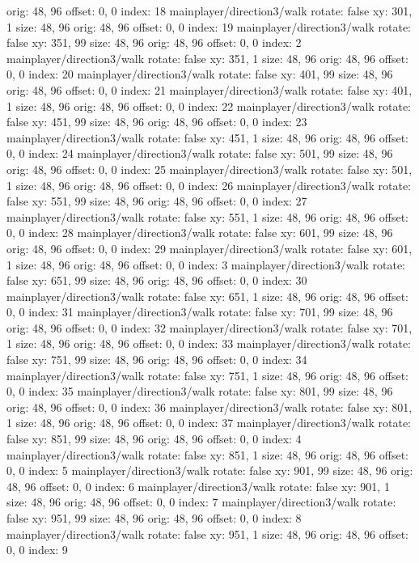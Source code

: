   orig: 48, 96
  offset: 0, 0
  index: 18
mainplayer/direction3/walk
  rotate: false
  xy: 301, 1
  size: 48, 96
  orig: 48, 96
  offset: 0, 0
  index: 19
mainplayer/direction3/walk
  rotate: false
  xy: 351, 99
  size: 48, 96
  orig: 48, 96
  offset: 0, 0
  index: 2
mainplayer/direction3/walk
  rotate: false
  xy: 351, 1
  size: 48, 96
  orig: 48, 96
  offset: 0, 0
  index: 20
mainplayer/direction3/walk
  rotate: false
  xy: 401, 99
  size: 48, 96
  orig: 48, 96
  offset: 0, 0
  index: 21
mainplayer/direction3/walk
  rotate: false
  xy: 401, 1
  size: 48, 96
  orig: 48, 96
  offset: 0, 0
  index: 22
mainplayer/direction3/walk
  rotate: false
  xy: 451, 99
  size: 48, 96
  orig: 48, 96
  offset: 0, 0
  index: 23
mainplayer/direction3/walk
  rotate: false
  xy: 451, 1
  size: 48, 96
  orig: 48, 96
  offset: 0, 0
  index: 24
mainplayer/direction3/walk
  rotate: false
  xy: 501, 99
  size: 48, 96
  orig: 48, 96
  offset: 0, 0
  index: 25
mainplayer/direction3/walk
  rotate: false
  xy: 501, 1
  size: 48, 96
  orig: 48, 96
  offset: 0, 0
  index: 26
mainplayer/direction3/walk
  rotate: false
  xy: 551, 99
  size: 48, 96
  orig: 48, 96
  offset: 0, 0
  index: 27
mainplayer/direction3/walk
  rotate: false
  xy: 551, 1
  size: 48, 96
  orig: 48, 96
  offset: 0, 0
  index: 28
mainplayer/direction3/walk
  rotate: false
  xy: 601, 99
  size: 48, 96
  orig: 48, 96
  offset: 0, 0
  index: 29
mainplayer/direction3/walk
  rotate: false
  xy: 601, 1
  size: 48, 96
  orig: 48, 96
  offset: 0, 0
  index: 3
mainplayer/direction3/walk
  rotate: false
  xy: 651, 99
  size: 48, 96
  orig: 48, 96
  offset: 0, 0
  index: 30
mainplayer/direction3/walk
  rotate: false
  xy: 651, 1
  size: 48, 96
  orig: 48, 96
  offset: 0, 0
  index: 31
mainplayer/direction3/walk
  rotate: false
  xy: 701, 99
  size: 48, 96
  orig: 48, 96
  offset: 0, 0
  index: 32
mainplayer/direction3/walk
  rotate: false
  xy: 701, 1
  size: 48, 96
  orig: 48, 96
  offset: 0, 0
  index: 33
mainplayer/direction3/walk
  rotate: false
  xy: 751, 99
  size: 48, 96
  orig: 48, 96
  offset: 0, 0
  index: 34
mainplayer/direction3/walk
  rotate: false
  xy: 751, 1
  size: 48, 96
  orig: 48, 96
  offset: 0, 0
  index: 35
mainplayer/direction3/walk
  rotate: false
  xy: 801, 99
  size: 48, 96
  orig: 48, 96
  offset: 0, 0
  index: 36
mainplayer/direction3/walk
  rotate: false
  xy: 801, 1
  size: 48, 96
  orig: 48, 96
  offset: 0, 0
  index: 37
mainplayer/direction3/walk
  rotate: false
  xy: 851, 99
  size: 48, 96
  orig: 48, 96
  offset: 0, 0
  index: 4
mainplayer/direction3/walk
  rotate: false
  xy: 851, 1
  size: 48, 96
  orig: 48, 96
  offset: 0, 0
  index: 5
mainplayer/direction3/walk
  rotate: false
  xy: 901, 99
  size: 48, 96
  orig: 48, 96
  offset: 0, 0
  index: 6
mainplayer/direction3/walk
  rotate: false
  xy: 901, 1
  size: 48, 96
  orig: 48, 96
  offset: 0, 0
  index: 7
mainplayer/direction3/walk
  rotate: false
  xy: 951, 99
  size: 48, 96
  orig: 48, 96
  offset: 0, 0
  index: 8
mainplayer/direction3/walk
  rotate: false
  xy: 951, 1
  size: 48, 96
  orig: 48, 96
  offset: 0, 0
  index: 9

